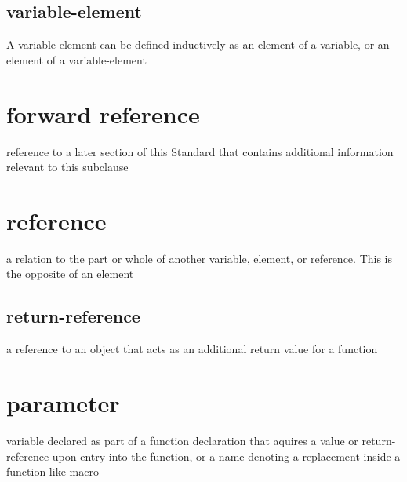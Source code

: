 \subsection{variable-element}
A variable-element can be defined inductively as an element of a variable, or an element of a variable-element
\section{forward reference}
reference to a later section of this Standard that contains additional information relevant to this subclause
\section{reference}
a relation to the part or whole of another variable, element, or reference. This is the opposite of an element
\subsection{return-reference}
a reference to an object that acts as an additional return value for a function
\section{parameter}
variable declared as part of a function declaration that aquires a value or return-reference upon entry into the function, or a name denoting a replacement inside a function-like macro
